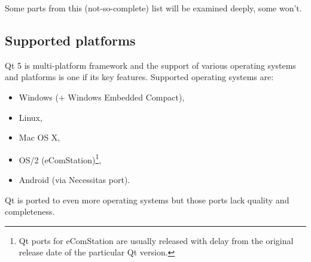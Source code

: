Some parts from this (not-so-complete) list will be examined deeply, some won't.

\subsection{Supported platforms}
Qt 5 is multi-platform framework and the support of various operating systems and platforms is one if its key features. Supported operating systems are:
\begin{itemize}
\item Windows ($+$ Windows Embedded Compact),
\item Linux,
\item Mac OS X,
\item OS/2 (eComStation)\footnote{Qt ports for eComStation are usually released with delay from the original release date of the particular Qt version.},
\item Android (via Necessitas port).
\end{itemize}
Qt is ported to even more operating systems but those ports lack quality and completeness.

